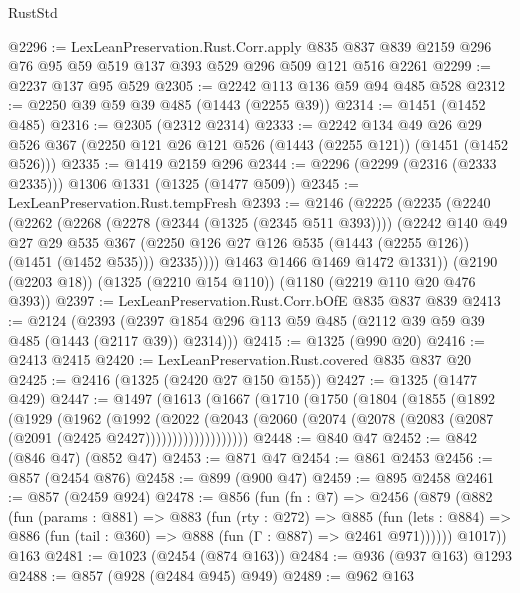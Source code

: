 \begin{lexlean}{RustStd}
\begin{coremodule}
@2296 := LexLeanPreservation.Rust.Corr.apply
    @835
    @837
    @839
    @2159
    @296
    @76
    @95
    @59
    @519
    @137
    @393
    @529
    @296
    @509
    @121
    @516
    @2261
@2299 := @2237 @137 @95 @529
@2305 := @2242 @113 @136 @59 @94 @485 @528
@2312 := @2250 @39 @59 @39 @485 (@1443 (@2255 @39))
@2314 := @1451 (@1452 @485)
@2316 := @2305 (@2312 @2314)
@2333 := @2242
    @134
    @49
    @26
    @29
    @526
    @367
    (@2250 @121 @26 @121 @526 (@1443 (@2255 @121)) (@1451 (@1452 @526)))
@2335 := @1419 @2159 @296
@2344 := @2296 (@2299 (@2316 (@2333 @2335))) @1306 @1331 (@1325 (@1477 @509))
@2345 := LexLeanPreservation.Rust.tempFresh
@2393 := @2146
    (@2225
      (@2235
        (@2240
          (@2262
            (@2268
              (@2278 (@2344 (@1325 (@2345 @511 @393))))
              (@2242
                @140
                @49
                @27
                @29
                @535
                @367
                (@2250 @126 @27 @126 @535 (@1443 (@2255 @126)) (@1451 (@1452 @535)))
                @2335))))
        @1463
        @1466
        @1469
        @1472
        @1331))
    (@2190 (@2203 @18))
    (@1325 (@2210 @154 @110))
    (@1180 (@2219 @110 @20 @476 @393))
@2397 := LexLeanPreservation.Rust.Corr.bOfE @835 @837 @839
@2413 := @2124
    (@2393 (@2397 @1854 @296 @113 @59 @485 (@2112 @39 @59 @39 @485 (@1443 (@2117 @39)) @2314)))
@2415 := @1325 (@990 @20)
@2416 := @2413 @2415
@2420 := LexLeanPreservation.Rust.covered @835 @837 @20
@2425 := @2416 (@1325 (@2420 @27 @150 @155))
@2427 := @1325 (@1477 @429)
@2447 := @1497
    (@1613
      (@1667
        (@1710
          (@1750
            (@1804
              (@1855
                (@1892
                  (@1929
                    (@1962
                      (@1992
                        (@2022
                          (@2043
                            (@2060
                              (@2074 (@2078 (@2083 (@2087 (@2091 (@2425 @2427)))))))))))))))))))
@2448 := @840 @47
@2452 := @842 (@846 @47) (@852 @47)
@2453 := @871 @47
@2454 := @861 @2453
@2456 := @857 (@2454 @876)
@2458 := @899 (@900 @47)
@2459 := @895 @2458
@2461 := @857 (@2459 @924)
@2478 := @856
    (fun (fn : @7) =>
    @2456
      (@879
        (@882
          (fun (params : @881) =>
          @883
            (fun (rty : @272) =>
            @885
              (fun (lets : @884) =>
              @886 (fun (tail : @360) => @888 (fun (Γ : @887) => @2461 @971))))))
        @1017))
    @163
@2481 := @1023 (@2454 (@874 @163))
@2484 := @936 (@937 @163) @1293
@2488 := @857 (@928 (@2484 @945) @949)
@2489 := @962 @163

\end{coremodule}
\end{lexlean}
